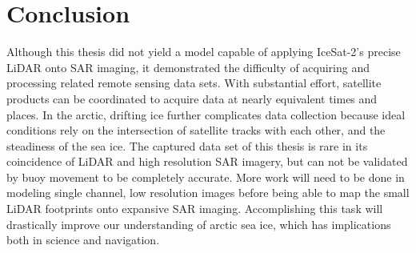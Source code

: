 \chapter{Conclusion}
\label{sec:Conclusion}

Although this thesis did not yield a model capable of applying IceSat-2's precise LiDAR onto SAR imaging, it demonstrated the difficulty of acquiring and processing related remote sensing data sets. With substantial effort, satellite products can be coordinated to acquire data at nearly equivalent times and places. In the arctic, drifting ice further complicates data collection because ideal conditions rely on the intersection of satellite tracks with each other, and the steadiness of the sea ice. The captured data set of this thesis is rare in its coincidence of LiDAR and high resolution SAR imagery, but can not be validated by buoy movement to be completely accurate. More work will need to be done in modeling single channel, low resolution images before being able to map the small LiDAR footprints onto expansive SAR imaging. Accomplishing this task will drastically improve our understanding of arctic sea ice, which has implications both in science and navigation.